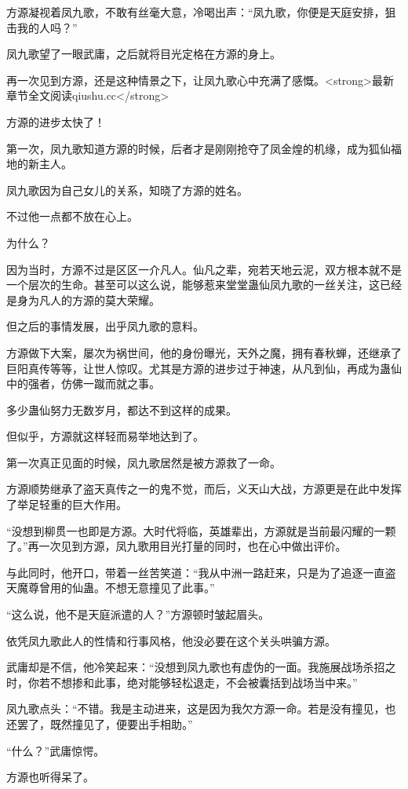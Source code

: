 \begin{this_body}
方源凝视着凤九歌，不敢有丝毫大意，冷喝出声：“凤九歌，你便是天庭安排，狙击我的人吗？”

凤九歌望了一眼武庸，之后就将目光定格在方源的身上。

再一次见到方源，还是这种情景之下，让凤九歌心中充满了感慨。<strong>最新章节全文阅读qiushu.cc</strong>

方源的进步太快了！

第一次，凤九歌知道方源的时候，后者才是刚刚抢夺了凤金煌的机缘，成为狐仙福地的新主人。

凤九歌因为自己女儿的关系，知晓了方源的姓名。

不过他一点都不放在心上。

为什么？

因为当时，方源不过是区区一介凡人。仙凡之辈，宛若天地云泥，双方根本就不是一个层次的生命。甚至可以这么说，能够惹来堂堂蛊仙凤九歌的一丝关注，这已经是身为凡人的方源的莫大荣耀。

但之后的事情发展，出乎凤九歌的意料。

方源做下大案，屡次为祸世间，他的身份曝光，天外之魔，拥有春秋蝉，还继承了巨阳真传等等，让世人惊叹。尤其是方源的进步过于神速，从凡到仙，再成为蛊仙中的强者，仿佛一蹴而就之事。

多少蛊仙努力无数岁月，都达不到这样的成果。

但似乎，方源就这样轻而易举地达到了。

第一次真正见面的时候，凤九歌居然是被方源救了一命。

方源顺势继承了盗天真传之一的鬼不觉，而后，义天山大战，方源更是在此中发挥了举足轻重的巨大作用。

“没想到柳贯一也即是方源。大时代将临，英雄辈出，方源就是当前最闪耀的一颗了。”再一次见到方源，凤九歌用目光打量的同时，也在心中做出评价。

与此同时，他开口，带着一丝苦笑道：“我从中洲一路赶来，只是为了追逐一直盗天魔尊曾用的仙蛊。不想无意撞见了此事。”

“这么说，他不是天庭派遣的人？”方源顿时皱起眉头。

依凭凤九歌此人的性情和行事风格，他没必要在这个关头哄骗方源。

武庸却是不信，他冷笑起来：“没想到凤九歌也有虚伪的一面。我施展战场杀招之时，你若不想掺和此事，绝对能够轻松退走，不会被囊括到战场当中来。”

凤九歌点头：“不错。我是主动进来，这是因为我欠方源一命。若是没有撞见，也还罢了，既然撞见了，便要出手相助。”

“什么？”武庸惊愕。

方源也听得呆了。


\end{this_body}
